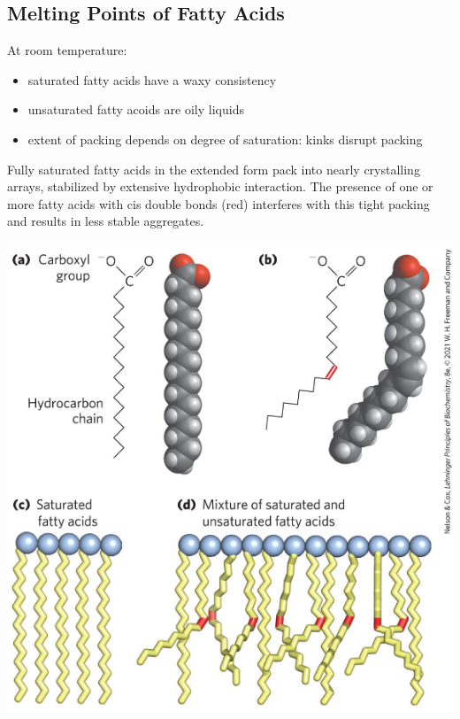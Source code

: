 \documentclass[10pt]{article}
\begin{document}
\subsection*{Melting Points of Fatty Acids}
At room temperature:
\begin{itemize}
    \item saturated fatty acids have a waxy consistency
    \item unsaturated fatty acoids are oily liquids
    \item extent of packing depends on degree of saturation: kinks disrupt packing
\end{itemize}
Fully saturated fatty acids in the extended form pack into nearly crystalling arrays, stabilized by extensive hydrophobic interaction.  The presence of one or more fatty acids with cis double bonds (red) interferes with this tight packing and results in less stable aggregates.
\begin{center}
    \includegraphics*[scale=0.8]{L2_11.png}
\end{center}
\end{document}

